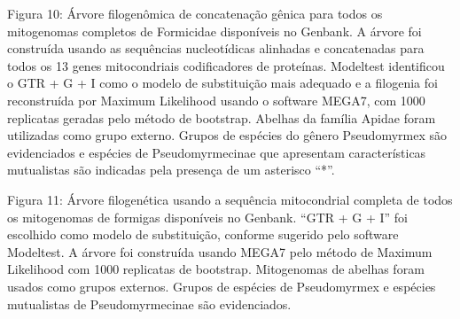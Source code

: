 \documentclass[../DISSERTACAO_MAIN.tex]{subfiles}
\begin{document}
	
	Figura 10: Árvore filogenômica de concatenação gênica para todos os mitogenomas completos de Formicidae disponíveis no Genbank.
	A árvore foi construída usando as sequências nucleotídicas alinhadas e concatenadas para todos os 13 genes mitocondriais codificadores de proteínas. Modeltest identificou o GTR + G + I como o modelo de substituição mais adequado e a filogenia foi reconstruída por Maximum Likelihood usando o software MEGA7, com 1000 replicatas geradas pelo método de bootstrap. Abelhas da família Apidae foram utilizadas como grupo externo. Grupos de espécies do gênero Pseudomyrmex são evidenciados e espécies de Pseudomyrmecinae que apresentam características mutualistas são indicadas pela presença de um asterisco “*”.
	
	Figura 11: Árvore filogenética usando a sequência mitocondrial completa de todos os mitogenomas de formigas disponíveis no Genbank.
	``GTR + G + I'' foi escolhido como modelo de substituição, conforme sugerido pelo software Modeltest. A árvore foi construída usando MEGA7 pelo método de Maximum Likelihood com 1000 replicatas de bootstrap. Mitogenomas de abelhas foram usados como grupos externos. Grupos de espécies de Pseudomyrmex e espécies mutualistas de Pseudomyrmecinae são evidenciados.
	
	
\end{document}
